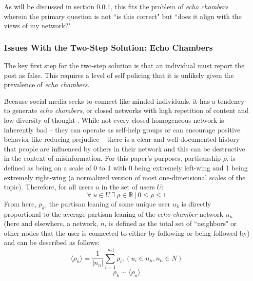 \documentclass[preprint,review,12pt]{elsarticle}
\begin{document}
As will be discussed in section \ref{sec: echo chambers}, this fits the problem of \textit{echo chambers} wherein the primary question is not ``is this correct" but ``does it align with the views of my network?" 

\subsubsection{Issues With the Two-Step Solution: Echo Chambers}
\label{sec: echo chambers}
 The key first step for the two-step solution is that an individual must report the post as false. This requires a level of self policing that it is unlikely given the prevalence of \textit{echo chambers}. 
 
Because social media seeks to connect like minded individuals, it has a tendency to generate \textit{echo chambers}, or closed networks with high repetition of content and low diversity of thought \cite{adibi2005proceedings, bastian2009international, pariser2011filter,bozdag2015breaking}. While not every closed homogeneous network is inherently bad -- they can operate as self-help groups \cite{kast2012under} or can encourage positive behavior like reducing prejudice \cite{paluck2011peer} -- there is a clear and well documented history that people are influenced by others in their network \cite{cialdini2004social,bollinger2012peer, bond201261,gerber2008social,gerber2009descriptive,meer2011brother,paluck2012salience,del2016spreading,bessi2015viral,friedkin1984structural,marsden1993network} and this can be destructive in the context of misinformation. For this paper's purposes, partisanship $\rho$, is defined as being on a scale of 0 to 1 with 0 being extremely left-wing and 1 being extremely right-wing (a normalized version of most one-dimensional scales of the topic). Therefore, for all users $u$ in the set of users $U$:
\begin{equation}
\label{basepartisanship}
    \forall \ u \in U \ \exists \ \rho \in \mathbb{R} \ | \ 0 \leq \rho \leq 1
\end{equation}
From here, $\rho_k$, the partisan leaning of some unique user $u_k$ is directly proportional to the average partisan leaning of the \textit{echo chamber} network $n_n$ (here and elsewhere, a network, $n$, is defined as the total set of ``neighbors" or other nodes that the user is connected to either by following or being followed by) and can be described as follows:
 \begin{equation}
    \label{ech chamber}
        \langle \rho_n \rangle = \frac{1}{|n_n|}\sum_{i=1}^{|n_n|}{\rho_i}, (u_i \in n_n, n_n \in N)
 \end{equation}
 \begin{equation}
    \label{leaningproportionaltonetwork}
        \rho_k \sim \langle \rho_n \rangle
 \end{equation}
 
\end{document}
